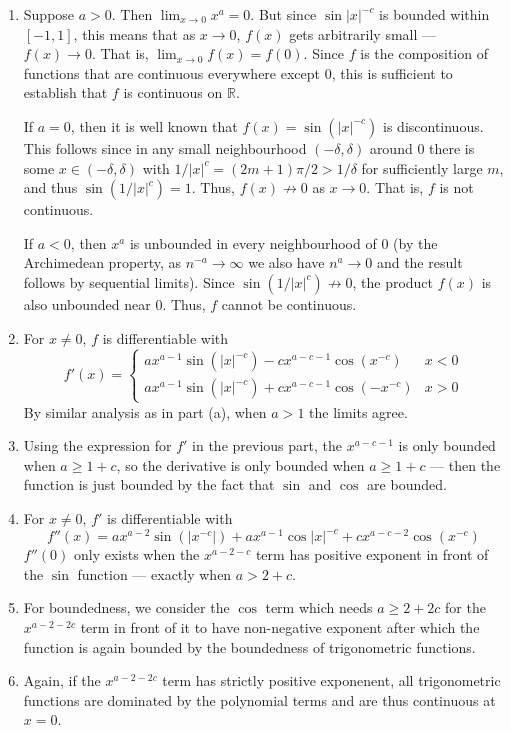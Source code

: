 \documentclass[12 pt, letterpaper]{hmcpset}
\begin{document}
\begin{solution}
	\begin{enumerate}
		\item Suppose $a > 0$. Then $\lim_{x \to 0} x^{a} = 0$. But since $\sin{\lvert x \rvert^{-c}}$ is bounded within $[-1, 1]$, this means that as $x \to 0$, $f(x)$ gets arbitrarily small --- $f(x) \to 0$. That is, $\lim_{x \to 0} f(x) = f(0)$. Since $f$ is the composition of functions that are continuous everywhere except $0$, this is sufficient to establish that $f$ is continuous on $\mathbb{R}$.

			If $a = 0$, then it is well known that $f(x) = \sin{(\lvert x \rvert^{-c})}$ is discontinuous. This follows since in any small neighbourhood $(- \delta, \delta)$ around $0$ there is some $x \in (-\delta, \delta)$ with $1/\lvert x \rvert^{c} = (2m + 1) \pi / 2 > 1 / \delta$ for sufficiently large $m$, and thus $\sin{(1/\lvert x \rvert^{c})} = 1$. Thus, $f(x) \not \to 0$ as $x \to 0$. That is, $f$ is not continuous.

			If $a < 0$, then $x^{a}$ is unbounded in every neighbourhood of $0$ (by the Archimedean property, as $n^{-a} \to \infty$ we also have $n^{a} \to 0$ and the result follows by sequential limits). Since $\sin{(1 / \lvert x \rvert^{c})} \not \to 0$, the product $f(x)$ is also unbounded near $0$. Thus, $f$ cannot be continuous.
		\item For $x \neq 0$, $f$ is differentiable with
			\[
				f'(x) = \begin{cases}
					a x^{a - 1} \sin{(\lvert x \rvert^{-c})} - c x^{a - c - 1} \cos{(x^{-c})} & x < 0 \\
					a x^{a - 1} \sin{(\lvert x \rvert^{-c})} + c x^{a - c - 1} \cos{(-x^{-c})} & x > 0
				\end{cases}
			\]
			By similar analysis as in part (a), when $a > 1$ the limits agree.
		\item Using the expression for $f'$ in the previous part, the $x^{a - c - 1}$ is only bounded when $a \ge 1 + c$, so the derivative is only bounded when $a \ge 1 + c$ --- then the function is just bounded by the fact that $\sin{}$ and $\cos{}$ are bounded.
		\item For $x \neq 0$, $f'$ is differentiable with
			\[
				f''(x) = a x^{a - 2} \sin{(\lvert x^{-c} \rvert)} + a x^{a - 1} \cos{\lvert x \rvert^{-c}} + c x^{a - c - 2} \cos{(x^{-c})} 
			\]
		$f''(0)$ only exists when the $x^{a - 2 - c}$ term has positive exponent in front of the $\sin$ function --- exactly when $a > 2 + c$.
	\item For boundedness, we consider the $\cos{}$ term which needs $a \ge 2 + 2c$ for the $x^{a - 2 - 2c}$ term in front of it to have non-negative exponent after which the function is again bounded by the boundedness of trigonometric functions.
	\item Again, if the $x^{a - 2 - 2c}$ term has strictly positive exponenent, all trigonometric functions are dominated by the polynomial terms and are thus continuous at $x = 0$.
	\end{enumerate}
\end{solution}
\end{document}
